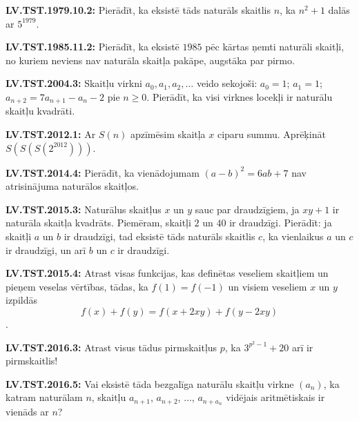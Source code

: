 \documentclass[a4paper]{article}
\newenvironment{uzdevums}[1][\unskip]{%
\vspace{3mm}
\noindent
\textbf{#1:}
\noindent}
{}
\begin{document}
\begin{uzdevums}[LV.TST.1979.10.2]
Pierādīt, ka eksistē tāds naturāls skaitlis $n$, ka $n^2+1$ dalās ar $5^{1979}$.
\end{uzdevums}

\begin{uzdevums}[LV.TST.1985.11.2]
Pierādīt, ka eksistē $1985$ pēc kārtas ņemti naturāli skaitļi, no kuriem
neviens nav naturāla skaitļa pakāpe, augstāka par pirmo.
\end{uzdevums}

\begin{uzdevums}[LV.TST.2004.3]
Skaitļu virkni $a_0, a_1, a_2,\ldots$ veido sekojoši:
$a_0 = 1$; $a_1 = 1$; $a_{n+2} = 7a_{n+1} - a_n - 2$ pie $n \geq 0$.
Pierādīt, ka visi virknes locekļi ir naturālu skaitļu kvadrāti.
\end{uzdevums}

\begin{uzdevums}[LV.TST.2012.1]
Ar $S(n)$ apzīmēsim skaitļa $x$ ciparu summu. Aprēķināt $S(S(S(2^{2012})))$.
\end{uzdevums}

\begin{uzdevums}[LV.TST.2014.4]
Pierādīt, ka vienādojumam $(a-b)^2 = 6ab + 7$ nav atrisinājuma naturālos skaitļos.
\end{uzdevums}

\begin{uzdevums}[LV.TST.2015.3]
Naturālus skaitļus $x$ un $y$ sauc par draudzīgiem, ja
$xy +1$ ir naturāla skaitļa kvadrāts. Piemēram, skaitļi
$2$ un $40$ ir draudzīgi. Pierādīt: ja skaitļi $a$ un $b$ ir draudzīgi, 
tad eksistē tāds naturāls skaitlis $c$, ka
vienlaikus $a$ un $c$ ir draudzīgi, un arī $b$ un $c$ ir draudzīgi.
\end{uzdevums}

\begin{uzdevums}[LV.TST.2015.4]
Atrast visas funkcijas, kas definētas veseliem skaitļiem un pieņem veselas vērtības, tādas, ka
$f(1) = f (-1)$
un visiem veseliem $x$ un $y$ izpildās
$$f(x)+f(y) = f(x + 2xy) + f(y - 2xy)$$.
\end{uzdevums}

\begin{uzdevums}[LV.TST.2016.3]
Atrast visus tādus pirmskaitļus $p$, ka $3^{p^2−1} + 20$ arī ir pirmskaitlis!
\end{uzdevums}

\begin{uzdevums}[LV.TST.2016.5]
Vai eksistē tāda bezgalīga naturālu skaitļu virkne $(a_n)$, 
ka katram naturālam $n$, skaitļu $a_{n+1}$, $a_{n+2}$, $\ldots$, $a_{n+a_n}$
vidējais aritmētiskais ir vienāds ar $n$?
\end{uzdevums}
\end{document}
